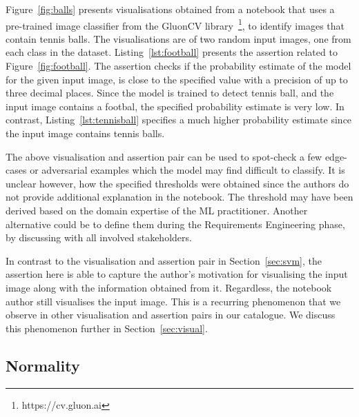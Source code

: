 \documentclass[conference]{IEEEtran}
\begin{document}
Figure~\ref{fig:balls} presents visualisations obtained from a notebook that uses a pre-trained image classifier from the GluonCV library~\footnote{https://cv.gluon.ai}, to identify images that contain tennis balls. The visualisations are of two random input images, one from each class in the dataset. Listing~\ref{lst:football} presents the assertion related to Figure~\ref{fig:football}. The assertion checks if the probability estimate of the model for the given input image, is close to the specified value with a precision of up to three decimal places. Since the model is trained to detect tennis ball, and the input image contains a footbal, the specified probability estimate is very low. In contrast, Listing~\ref{lst:tennisball} specifies a much higher probability estimate since the input image contains tennis balls.

The above visualisation and assertion pair can be used to spot-check a few edge-cases or adversarial examples which the model may find difficult to classify. It is unclear however, how the specified thresholds were obtained since the authors do not provide additional explanation in the notebook. The threshold may have been derived based on the domain expertise of the ML practitioner. Another alternative could be to define them during the Requirements Engineering phase, by discussing with all involved stakeholders\cite{CITEME}.

In contrast to the visualisation and assertion pair in Section~\ref{sec:svm}, the assertion here is able to capture the author's motivation for visualising the input image along with the information obtained from it. Regardless, the notebook author still visualises the input image. This is a recurring phenomenon that we observe in other visualisation and assertion pairs in our catalogue. We discuss this phenomenon further in Section~\ref{sec:visual}.

\subsection{Normality}\label{sec:normal}
\end{document}
